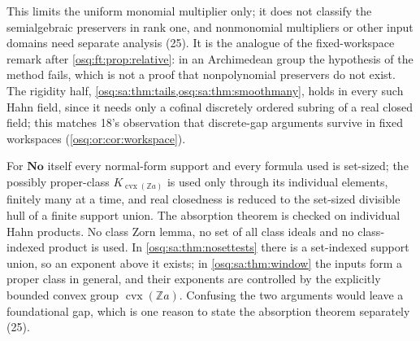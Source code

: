 \documentclass[11pt,letterpaper]{article}
\numberwithin{equation}{section}
\theoremstyle{definition}
\theoremstyle{remark}
\theoremstyle{plain}
\newcommand{\No}{\mathbf{No}}
\newcommand{\Z}{\mathbb Z}
\begin{document}
This limits the uniform monomial multiplier only; it does not classify the semialgebraic preservers in rank one, and nonmonomial multipliers or other
input domains need separate analysis (25). It is the analogue of the fixed-workspace remark after \cref{osq:ft:prop:relative}: in an Archimedean group the
hypothesis of the method fails, which is not a proof that nonpolynomial preservers do not exist. The rigidity half, \cref{osq:sa:thm:tails,osq:sa:thm:smoothmany},
holds in every such Hahn field, since it needs only a cofinal discretely ordered subring of a real closed field; this matches 18's observation that
discrete-gap arguments survive in fixed workspaces (\cref{osq:or:cor:workspace}).

For $\No$ itself every normal-form support and every formula used is set-sized; the possibly proper-class $K_{\operatorname{cvx}(\Z a)}$ is used only through
its individual elements, finitely many at a time, and real closedness is reduced to the set-sized divisible hull of a finite support union. The absorption
theorem is checked on individual Hahn products. No class Zorn lemma, no set of all class ideals and no class-indexed product is used. In
\cref{osq:sa:thm:nosettests} there is a set-indexed support union, so an exponent above it exists; in \cref{osq:sa:thm:window} the inputs form a proper class
in general, and their exponents are controlled by the explicitly bounded convex group $\operatorname{cvx}(\Z a)$. Confusing the two arguments would leave a
foundational gap, which is one reason to state the absorption theorem separately (25).
\end{document}
